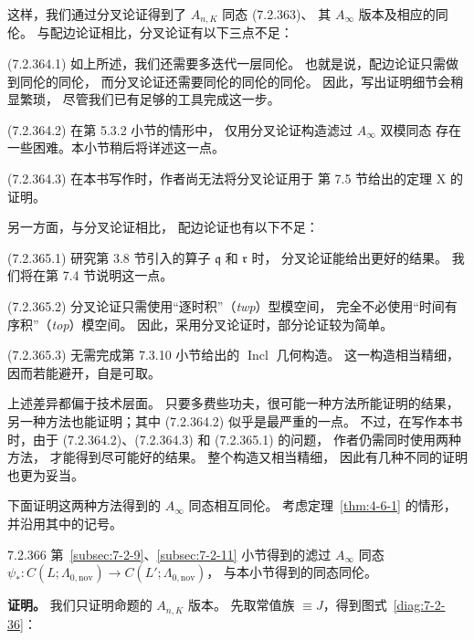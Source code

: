
这样，我们通过分叉论证得到了
$A_{n,K}$ 同态 (7.2.363)、
其 $A_\infty$ 版本及相应的同伦。
与配边论证相比，分叉论证有以下三点不足：

\par\noindent\textup{(7.2.364.1)}
如上所述，我们还需要多迭代一层同伦。
也就是说，配边论证只需做到同伦的同伦，
而分叉论证还需要同伦的同伦的同伦。
因此，写出证明细节会稍显繁琐，
尽管我们已有足够的工具完成这一步。

\par\noindent\textup{(7.2.364.2)}
在第 5.3.2 小节的情形中，
仅用分叉论证构造滤过 $A_\infty$ 双模同态
存在一些困难。本小节稍后将详述这一点。

\par\noindent\textup{(7.2.364.3)}
在本书写作时，作者尚无法将分叉论证用于
第 7.5 节给出的定理 X 的证明。

另一方面，与分叉论证相比，
配边论证也有以下不足：

\par\noindent\textup{(7.2.365.1)}
研究第 3.8 节引入的算子
$\mathfrak q$ 和 $\mathfrak r$ 时，
分叉论证能给出更好的结果。
我们将在第 7.4 节说明这一点。

\par\noindent\textup{(7.2.365.2)}
分叉论证只需使用“逐时积”（\emph{twp}）型模空间，
完全不必使用“时间有序积”（\emph{top}）模空间。
因此，采用分叉论证时，部分论证较为简单。

\par\noindent\textup{(7.2.365.3)}
无需完成第 7.3.10 小节给出的
$\operatorname{Incl}$ 几何构造。
这一构造相当精细，因而若能避开，自是可取。

上述差异都偏于技术层面。
只要多费些功夫，很可能一种方法所能证明的结果，
另一种方法也能证明；其中 (7.2.364.2)
似乎是最严重的一点。
不过，在写作本书时，由于
(7.2.364.2)、(7.2.364.3) 和
(7.2.365.1) 的问题，
作者仍需同时使用两种方法，
才能得到尽可能好的结果。
整个构造又相当精细，
因此有几种不同的证明也更为妥当。

下面证明这两种方法得到的
$A_\infty$ 同态相互同伦。
考虑定理~\ref{thm:4-6-1} 的情形，
并沿用其中的记号。

\begin{proposition}{7.2.366}\label{prop:7-2-366}
第~\ref{subsec:7-2-9}、\ref{subsec:7-2-11}
小节得到的滤过 $A_\infty$ 同态
$\psi_*\colon C(L;\Lambda_{0,\mathrm{nov}})
\to C(L';\Lambda_{0,\mathrm{nov}})$，
与本小节得到的同态同伦。
\end{proposition}

\noindent\textbf{证明。}
我们只证明命题的 $A_{n,K}$ 版本。
先取常值族 $\equiv J$，得到图式~\ref{diag:7-2-36}：

